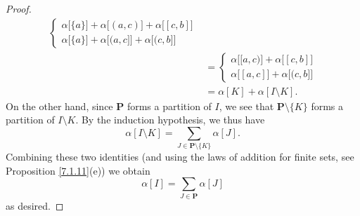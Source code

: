 \begin{proof}
\begin{align*}
\begin{cases}
            \alpha\big[\{a\}\big] + \alpha\big[(a, c)\big] + \alpha\big[[c, b]\big] \\
            \alpha\big[\{a\}\big] + \alpha\big[(a, c]\big] + \alpha\big[(c, b]\big]
        \end{cases}                      \\
                               & = \begin{cases}
            \alpha\big[[a, c)\big] + \alpha\big[[c, b]\big] \\
                \alpha\big[[a, c]\big] + \alpha\big[(c, b]\big]
        \end{cases}                     \\
                               & = \alpha[K] + \alpha[I \setminus K].
    \end{align*}
    On the other hand, since \(\mathbf{P}\) forms a partition of \(I\), we see that \(\mathbf{P} \setminus \{K\}\) forms a partition of \(I \setminus K\).
    By the induction hypothesis, we thus have
    \[
        \alpha[I \setminus K] = \sum_{J \in \mathbf{P} \setminus \{K\}} \alpha[J].
    \]
    Combining these two identities (and using the laws of addition for finite sets, see Proposition \ref{7.1.11}(e)) we obtain
    \[
        \alpha[I] = \sum_{J \in \mathbf{P}} \alpha[J]
    \]
    as desired.


\end{proof}
